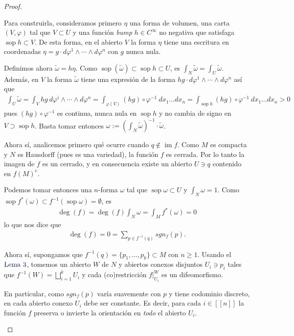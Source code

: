 \documentclass[11pt]{article}
\newcommand{\im}{\operatorname{im}}
\newcommand{\sop}{\operatorname{sop}}
\newcommand{\nat}[1]{[\![#1]\!]}
\newcommand{\paint}[1]{\color{color}{#1}}
\newcommand{\tpaing}[1]{\paint{\text{#1}}}
\begin{document}
\begin{proof}
\begin{itemize}[listparindent = \parindent]
Para construirla, consideramos primero  $\eta$ una forma de volumen, una carta $(V,\varphi)$ tal que $V \subset U$ y una función \textit{bump} $h \in C^\infty$ no negativa que satisfaga $\sop h \subset V$. De esta forma, en el abierto $V$ la forma $\eta$ tiene una escritura en coordenadas $\eta = g \cdot d\varphi^1 \wedge \cdots \wedge d\varphi^n$ con $g$ nunca nula. 

Definimos ahora $\widetilde{\omega} = h\eta$. Como $\sop(\widetilde{\omega}) \subset \sop h \subset U$, es $\int_N \widetilde{\omega} = \int_U \widetilde{\omega}$. Además, en $V$ la forma $\widetilde{\omega}$ tiene una expresión de la forma $hg \cdot d\varphi^1 \wedge \cdots \wedge d\varphi^n$ así que
\begin{align*}
\int_U \widetilde{\omega} = \int_{V} hg \ d\varphi^i \wedge \cdots \wedge d\varphi^n = \int_{\varphi(V)} (hg) \circ \varphi^{-1} \ dx_1 \dots dx_n = \int_{\sop h} (hg) \circ \varphi^{-1} \ dx_1 \dots dx_n > 0
\end{align*}
pues $(hg) \circ \varphi^{-1}$ es continua, nunca nula en $\sop h$ y no cambia de signo en $V \supset \sop h$. Basta tomar entonces $\omega := (\int_N \widetilde{\omega})^{-1} \cdot \widetilde{\omega}$.

Ahora sí, analicemos primero qué ocurre cuando $q \not \in \im f$. Como $M$ es compacta y $N$ es Hausdorff (pues es una variedad), la función $f$ es cerrada. Por lo tanto la imagen de $f$ es un cerrado, y en consecuencia existe un abierto $U \ni q$ contenido en $f(M)^c$. 

Podemos tomar entonces una $n$-forma $\omega$ tal que $\sop \omega \subset U$ y $\int_N \omega = 1$. Como $\sop f^*(\omega) \subset  f^{-1}(\sop \omega) = \emptyset$, es
\begin{align*}
\deg(f) = \deg(f) \int_N\omega = \int_Mf^*(\omega) = 0
\end{align*}
lo que nos dice que 
\begin{align*}
\deg(f) = 0 = \sum_{p \in f^{-1}(q)}sgn_f(p).
\end{align*}

Ahora sí, supongamos que $f^{-1}(q) = \{p_1, \dots, p_k\} \subset M$ con $n \geq 1$. Usando el $\tpaing{Lema $3$}$, tomemos un abierto $W$ de $N$ y abiertos conexos disjuntos $U_i \ni p_i$ tales que $f^{-1}(W) = \bigsqcup_{i=1}^k U_i$ y cada (co)restricción $f|_{U_i}^W$ es un difeomorfismo. 

En particular, como $sgn_f(p)$ varía suavemente con $p$ y tiene codominio discreto, en cada abierto conexo $U_i$ debe ser constante. Es decir, para cada $i \in \nat{n}$ la función $f$ preserva o invierte la orientación en \textit{todo} el abierto $U_i$.


\end{itemize}
\end{proof}
\end{document}
